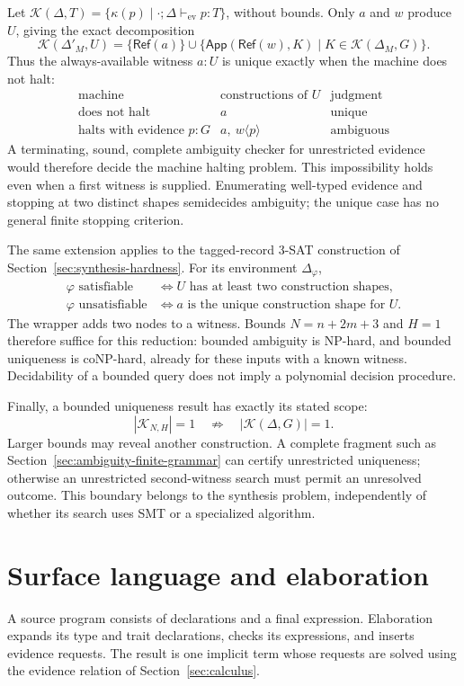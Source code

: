 \documentclass[10pt,a4paper]{article}
\newcommand{\iarg}[1]{\langle#1\rangle}
\newcommand{\kw}[1]{\mathsf{#1}}
\begin{document}
Let $\mathcal K(\Delta,T)=\{\kappa(p)\mid
\cdot;\Delta\vdash_{\mathrm{ev}}p:T\}$, without bounds. Only $a$ and $w$
produce $U$, giving the exact decomposition
\[
 \mathcal K(\Delta'_M,U)
   =\{\kw{Ref}(a)\}
     \cup\{\kw{App}(\kw{Ref}(w),K)\mid K\in\mathcal K(\Delta_M,G)\}.
\]
Thus the always-available witness $a:U$ is unique exactly when the machine
does not halt:
\[
\begin{array}{c|c|c}
 \text{machine} & \text{constructions of }U & \text{judgment}\\ \hline
 \text{does not halt} & a & \text{unique}\\
 \text{halts with evidence }p:G & a,\ w\iarg{p} & \text{ambiguous}
\end{array}
\]
A terminating, sound, complete ambiguity checker for unrestricted evidence
would therefore decide the machine halting problem. This impossibility holds
even when a first witness is supplied. Enumerating well-typed evidence and
stopping at two distinct shapes semidecides ambiguity; the unique case has no
general finite stopping criterion.

The same extension applies to the tagged-record 3-SAT construction of
Section~\ref{sec:synthesis-hardness}. For its environment $\Delta_\varphi$,
\[
\begin{aligned}
 \varphi\text{ satisfiable}
   &\iff U\text{ has at least two construction shapes},\\
 \varphi\text{ unsatisfiable}
   &\iff a\text{ is the unique construction shape for }U.
\end{aligned}
\]
The wrapper adds two nodes to a witness. Bounds $N=n+2m+3$ and $H=1$ therefore
suffice for this reduction: bounded ambiguity is NP-hard, and bounded uniqueness
is coNP-hard, already for these inputs with a known witness. Decidability of a
bounded query does not imply a polynomial decision procedure.

Finally, a bounded uniqueness result has exactly its stated scope:
\[
 |\mathcal K_{N,H}|=1
 \quad\not\Longrightarrow\quad
 |\mathcal K(\Delta,G)|=1.
\]
Larger bounds may reveal another construction. A complete fragment such as
Section~\ref{sec:ambiguity-finite-grammar} can certify unrestricted uniqueness;
otherwise an unrestricted second-witness search must permit an unresolved
outcome. This boundary belongs to the synthesis problem, independently of
whether its search uses SMT or a specialized algorithm.

\newpage
\appendix
\section{Surface language and elaboration}
\label{sec:surface-language}
A source program consists of declarations and a final expression. Elaboration
expands its type and trait declarations, checks its expressions, and inserts
evidence requests. The result is one implicit term whose requests are solved
using the evidence relation of Section~\ref{sec:calculus}.
\end{document}
